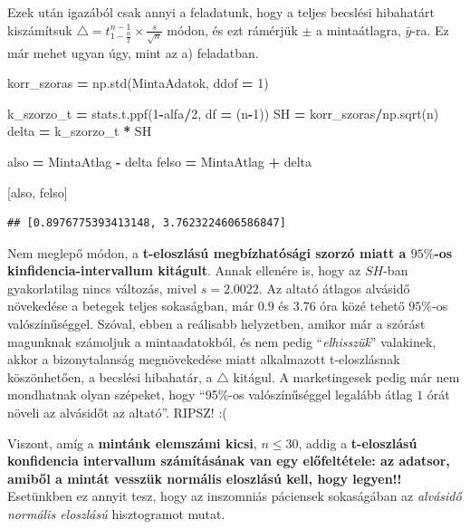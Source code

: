 \documentclass[
]{book}
\newenvironment{Shaded}{\begin{snugshade}}{\end{snugshade}}
\newcommand{\DecValTok}[1]{\textcolor[rgb]{0.00,0.00,0.81}{#1}}
\newcommand{\NormalTok}[1]{#1}
\newcommand{\OperatorTok}[1]{\textcolor[rgb]{0.81,0.36,0.00}{\textbf{#1}}}
\begin{document}
Ezek után igazából csak annyi a feladatunk, hogy a teljes becslési hibahatárt kiszámítsuk \(\triangle = t_{1-\frac{\alpha}{2}}^{n-1} \times \frac{s}{\sqrt{n}}\) módon, és ezt rámérjük \(\pm\) a mintaátlagra, \(\bar{y}\)-ra. Ez már mehet ugyan úgy, mint az a) feladatban.

\begin{Shaded}
\begin{Highlighting}[]
\NormalTok{korr\_szoras }\OperatorTok{=}\NormalTok{ np.std(MintaAdatok, ddof }\OperatorTok{=} \DecValTok{1}\NormalTok{)}

\NormalTok{k\_szorzo\_t }\OperatorTok{=}\NormalTok{ stats.t.ppf(}\DecValTok{1}\OperatorTok{{-}}\NormalTok{alfa}\OperatorTok{/}\DecValTok{2}\NormalTok{, df }\OperatorTok{=}\NormalTok{ (n}\OperatorTok{{-}}\DecValTok{1}\NormalTok{))}
\NormalTok{SH }\OperatorTok{=}\NormalTok{ korr\_szoras}\OperatorTok{/}\NormalTok{np.sqrt(n)}
\NormalTok{delta }\OperatorTok{=}\NormalTok{ k\_szorzo\_t }\OperatorTok{*}\NormalTok{ SH}

\NormalTok{also }\OperatorTok{=}\NormalTok{ MintaAtlag }\OperatorTok{{-}}\NormalTok{ delta}
\NormalTok{felso }\OperatorTok{=}\NormalTok{ MintaAtlag }\OperatorTok{+}\NormalTok{ delta}

\NormalTok{[also, felso]}
\end{Highlighting}
\end{Shaded}

\begin{verbatim}
## [0.8976775393413148, 3.7623224606586847]
\end{verbatim}

Nem meglepő módon, a \textbf{t-eloszlású megbízhatósági szorzó miatt a \(95\%\)-os kinfidencia-intervallum kitágult}. Annak ellenére is, hogy az \(SH\)-ban gyakorlatilag nincs változás, mivel \(s=2.0022\). Az altató átlagos alvásidő növekedése a betegek teljes sokaságban, már \(0.9\) és \(3.76\) óra közé tehető \(95\%\)-os valószínűséggel. Szóval, ebben a reálisabb helyzetben, amikor már a szórást magunknak számoljuk a mintaadatokból, és nem pedig ``\emph{elhisszük}'' valakinek, akkor a bizonytalanság megnövekedése miatt alkalmazott t-eloszlásnak köszönhetően, a becslési hibahatár, a \(\triangle\) kitágul. A marketingesek pedig már nem mondhatnak olyan szépeket, hogy ``95\%-os valószínűséggel legalább átlag \(1\) órát növeli az alvásidőt az altató''. RIPSZ! :(

Viszont, amíg a \textbf{mintánk elemszámi kicsi}, \(n \leq 30\), addig a \textbf{t-eloszlású konfidencia intervallum számításának van egy előfeltétele: az adatsor, amiből a mintát vesszük normális eloszlású kell, hogy legyen!!}
Esetünkben ez annyit tesz, hogy az inszomniás páciensek sokaságában az \emph{alvásidő normális eloszlású} hisztogramot mutat.
\end{document}
